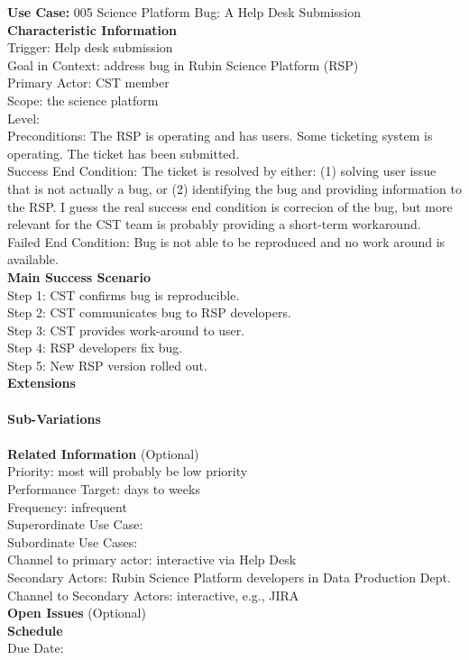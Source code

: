 {\bf Use Case:} 005 Science Platform Bug: A Help Desk Submission  \\

{\bf Characteristic Information} \\
Trigger: Help desk submission \\
Goal in Context: address bug in Rubin Science Platform (RSP)\\
Primary Actor: CST member \\
Scope: the science platform \\
Level: \\
Preconditions: The RSP is operating and has users.  Some ticketing system is operating.  The ticket has been submitted. \\
Success End Condition: The ticket is resolved by either: (1) solving user issue that is not actually a bug, or (2) identifying the bug and providing information to the RSP.  I guess the real success end condition is correcion of the bug, but more relevant for the CST team is probably providing a short-term workaround. \\
Failed End Condition: Bug is not able to be reproduced and no work around is available. \\

{\bf Main Success Scenario} \\
Step 1: CST confirms bug is reproducible. \\
Step 2: CST communicates bug to RSP developers. \\
Step 3: CST provides work-around to user. \\
Step 4: RSP developers fix bug. \\
Step 5: New RSP version rolled out. \\

{\bf Extensions} \\
\\

{\bf Sub-Variations} \\
\\

{\bf Related Information} (Optional) \\
Priority: most will probably be low priority \\
Performance Target: days to weeks \\
Frequency: infrequent \\
Superordinate Use Case:  \\
Subordinate Use Cases: \\
Channel to primary actor: interactive via Help Desk \\
Secondary Actors: Rubin Science Platform developers in Data Production Dept. \\
Channel to Secondary Actors: interactive, e.g., JIRA \\

{\bf Open Issues} (Optional) \\

{\bf Schedule} \\
Due Date: \\
